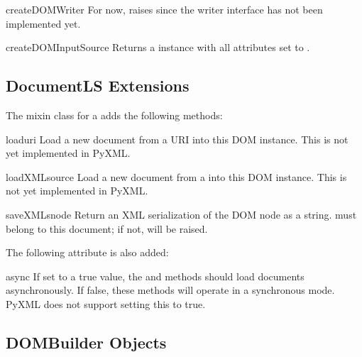 \documentclass{howto}
\begin{document}
\begin{methoddesc}[DOMImplementationLS]{createDOMWriter}{}
  For now, raises  since the writer
  interface has not been implemented yet.
\end{methoddesc}

\begin{methoddesc}[DOMImplementationLS]{createDOMInputSource}{}
  Returns a  instance with all attributes set to
  .
\end{methoddesc}


\subsection{DocumentLS Extensions}

The  mixin class for a  adds the
following methods:

\begin{methoddesc}[DocumentLS]{load}{uri}
  Load a new document from a URI into this DOM 
  instance.  This is not yet implemented in PyXML.
\end{methoddesc}

\begin{methoddesc}[DocumentLS]{loadXML}{source}
  Load a new document from a  into this DOM
   instance.  This is not yet implemented in PyXML.
\end{methoddesc}

\begin{methoddesc}[DocumentLS]{saveXML}{snode}
  Return an XML serialization of the DOM node  as a
  string.   must belong to this document; if not,
   will be raised.
\end{methoddesc}

The following attribute is also added:

\begin{memberdesc}[DocumentLS]{async}
  If set to a true value, the  and 
  methods should load documents asynchronously.  If false, these
  methods will operate in a synchronous mode.
  PyXML does not support setting this to true.
\end{memberdesc}


\subsection{DOMBuilder Objects}
\end{document}
